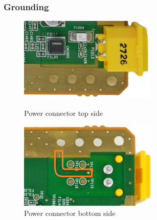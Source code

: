 \documentclass[11pt,a4paper,titlepage]{article}
\begin{document}
    \subsubsection{Grounding}
      \begin{figure}[h]
        \begin{minipage}{.47 \textwidth}
          \includegraphics[width = .95\textwidth]{power_connector_top.png}
          \caption{Power connector top side}
          \label{fig:powertop}
        \end{minipage}
        \vspace{5mm}
        \begin{minipage}{.47 \textwidth}
          \includegraphics[width = .95\textwidth]{power_connector_bottom.png}
          \caption{Power connector bottom side}
          \label{fig:powerbottom}
        \end{minipage}
      \end{figure}
\end{document}
